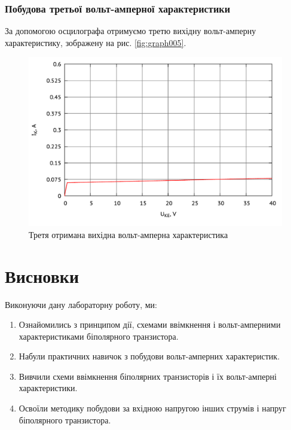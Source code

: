 \documentclass[a4paper,oneside,12pt,DIV=12,titlepage]{scrartcl}
\begin{document}
			\subsubsection{Побудова третьої вольт-амперної характеристики}
				За допомогою осцилографа отримуємо третю вихідну вольт-амперну характеристику, зображену на рис. \ref{fig:graph005}.
				
				\begin{figure}[h]
					\centering
					\includegraphics[width=0.45\textheight]{graph006.pdf}
					\caption{Третя отримана вихідна вольт-амперна характеристика}
					\label{fig:graph006}
				\end{figure}
				
	\section{Висновки}
		Виконуючи дану лабораторну роботу, ми:
			\begin{enumerate}
				\item Ознайомились з принципом дії, схемами ввімкнення і вольт-амперними характеристиками біполярного транзистора.
				\item Набули практичних навичок з побудови вольт-амперних характеристик.
				\item Вивчили схеми ввімкнення біполярних транзисторів і їх вольт-амперні характеристики. 
				\item Освоїли методику побудови за вхідною напругою інших струмів і напруг біполярного транзистора.
			\end{enumerate}
			
\end{document}
